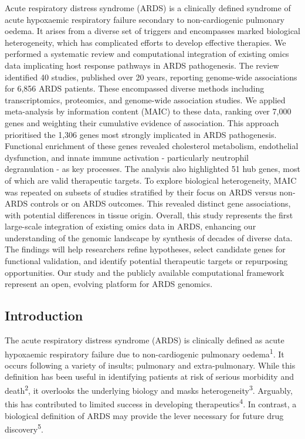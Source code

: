 \documentclass[
  11,
  a4paper,
]{article}
\begin{document}
Acute respiratory distress syndrome (ARDS) is a clinically defined
syndrome of acute hypoxaemic respiratory failure secondary to
non-cardiogenic pulmonary oedema. It arises from a diverse set of
triggers and encompasses marked biological heterogeneity, which has
complicated efforts to develop effective therapies. We performed a
systematic review and computational integration of existing omics data
implicating host response pathways in ARDS pathogenesis. The review
identified 40 studies, published over 20 years, reporting genome-wide
associations for 6,856 ARDS patients. These encompassed diverse methods
including transcriptomics, proteomics, and genome-wide association
studies. We applied meta-analysis by information content (MAIC) to these
data, ranking over 7,000 genes and weighting their cumulative evidence
of association. This approach prioritised the 1,306 genes most strongly
implicated in ARDS pathogenesis. Functional enrichment of these genes
revealed cholesterol metabolism, endothelial dysfunction, and innate
immune activation - particularly neutrophil degranulation - as key
processes. The analysis also highlighted 51 hub genes, most of which are
valid therapeutic targets. To explore biological heterogeneity, MAIC was
repeated on subsets of studies stratified by their focus on ARDS versus
non-ARDS controls or on ARDS outcomes. This revealed distinct gene
associations, with potential differences in tissue origin. Overall, this
study represents the first large-scale integration of existing omics
data in ARDS, enhancing our understanding of the genomic landscape by
synthesis of decades of diverse data. The findings will help researchers
refine hypotheses, select candidate genes for functional validation, and
identify potential therapeutic targets or repurposing opportunities. Our
study and the publicly available computational framework represent an
open, evolving platform for ARDS genomics.

\newpage

\hypertarget{introduction}{%
\subsection{Introduction}\label{introduction}}

The acute respiratory distress syndrome (ARDS) is clinically defined as
acute hypoxaemic respiratory failure due to non-cardiogenic pulmonary
oedema\textsuperscript{1}. It occurs following a variety of insults;
pulmonary and extra-pulmonary. While this definition has been useful in
identifying patients at risk of serious morbidity and
death\textsuperscript{2}, it overlooks the underlying biology and masks
heterogeneity\textsuperscript{3}. Arguably, this has contributed to
limited success in developing therapeutics\textsuperscript{4}. In
contrast, a biological definition of ARDS may provide the lever
necessary for future drug discovery\textsuperscript{5}.
\end{document}
